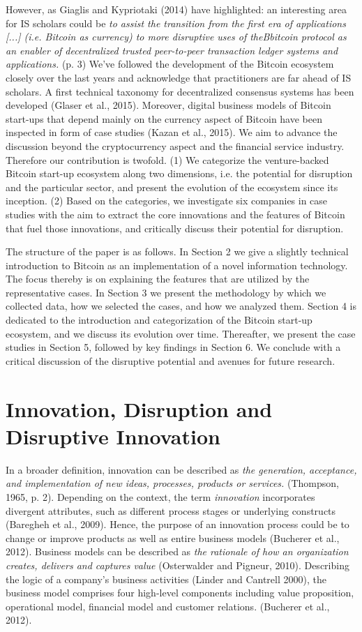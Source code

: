 However, as Giaglis and Kypriotaki  (2014) have highlighted: an interesting area 
for IS scholars could be \emph{to assist the transition from the first era of applications 
[...] (i.e. Bitcoin as currency) to more disruptive uses of theBbitcoin protocol 
as an enabler of decentralized trusted peer-to-peer transaction ledger systems 
and applications.} (p. 3) We've followed the development of the Bitcoin ecosystem 
closely over the last years and acknowledge that practitioners are far ahead of 
IS scholars. A first technical taxonomy for decentralized consensus systems has 
been developed (Glaser et al., 2015). Moreover, digital business models of Bitcoin 
start-ups that depend mainly on the currency aspect of Bitcoin have been inspected 
in form of case studies (Kazan et al., 2015). We aim to advance the discussion 
beyond the cryptocurrency aspect and the financial service industry. Therefore 
our contribution is twofold. (1) We categorize the venture-backed Bitcoin start-up 
ecosystem along two dimensions, i.e. the potential for disruption and the particular 
sector, and present the evolution of the ecosystem since its inception. (2) Based 
on the categories, we investigate six companies in case studies with the aim to 
extract the core innovations and the features of Bitcoin that fuel those innovations, 
and critically discuss their potential for disruption.

The structure of the paper is as follows. In Section 2 we give a slightly technical 
introduction to Bitcoin as an implementation of a novel information technology. 
The focus thereby is on explaining the features that are utilized by the representative 
cases. In Section 3 we present the methodology by which we collected data, how 
we selected the cases, and how we analyzed them. Section 4 is dedicated to the 
introduction and categorization of the Bitcoin start-up ecosystem, and we discuss 
its evolution over time. Thereafter, we present the case studies in Section 5, 
followed by key findings in Section 6. We conclude with a critical discussion of 
the disruptive potential and avenues for future research.

\section{Innovation, Disruption and Disruptive Innovation}

In a broader definition, innovation can be described as \emph{the generation, acceptance, 
and implementation of new ideas, processes, products or services.} (Thompson, 
1965, p. 2). Depending on the context, the term \emph{innovation} incorporates divergent 
attributes, such as different process stages or underlying constructs (Baregheh 
et al., 2009). Hence, the purpose of an innovation process could be to change or 
improve products as well as entire business models (Bucherer et al., 2012). Business 
models can be described as \emph{the rationale of how an organization creates, delivers 
and captures value} (Osterwalder and Pigneur, 2010). Describing the logic of a 
company's business activities (Linder and Cantrell 2000), the business model comprises 
four high-level components including value proposition, operational model, financial 
model and customer relations. (Bucherer et al., 2012). 

